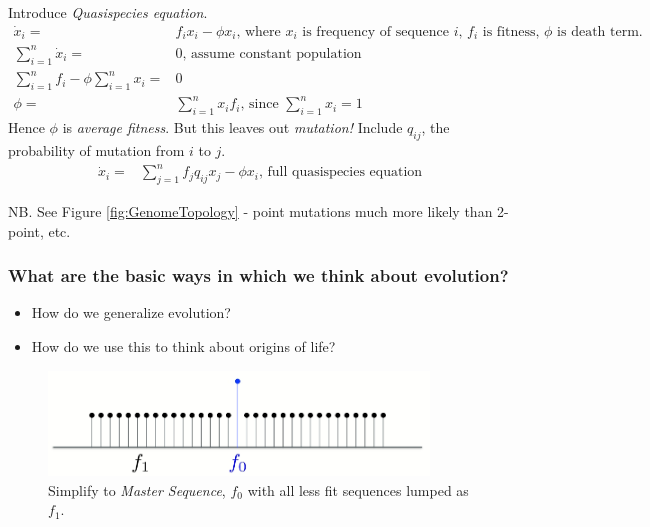\documentclass[]{article}
\begin{document}
Introduce \emph{Quasispecies equation}.
\begin{align*}
\dot x_i =& f_i x_i - \phi x_i \text{, where $x_i$ is frequency of sequence $i$, $f_i$ is fitness, $\phi$ is death term.}\\
\sum_{i=1}^{n} \dot x_i =& 0 \text{, assume constant population}\\
\sum_{i=1}^{n} f_i - \phi \sum_{i=1}^{n} x_i =& 0\\
\phi =& \sum_{i=1}^{n}x_i f_i\text{, since $\sum_{i=1}^{n}x_i = 1$}
\end{align*}
Hence $\phi$ is \emph{average fitness}. But this leaves out \emph{mutation!} Include $q_{ij}$, the probability of mutation from $i$ to $j$.
\begin{align*}
\dot x_i =& \sum_{j=1}^{n} f_j q_{ij}x_j - \phi x_i\text{, full quasispecies equation} 
\end{align*}

NB. See Figure \ref{fig:GenomeTopology} - point mutations much more likely than 2-point, etc.

\subsubsection{What are the basic ways in which we think about evolution?}

\begin{itemize}
	\item How do we generalize evolution?
	\item How do we use this to think about origins of life? 
\end{itemize}

\begin{figure}[H]
	\caption{Simplify to \emph{Master Sequence}, $f_0$ with all less fit sequences lumped as $f_1$.}\label{fig:SteadyStateSolution} 
	\includegraphics[width=0.9\textwidth]{SteadyStateSolution}
\end{figure}
\end{document}
